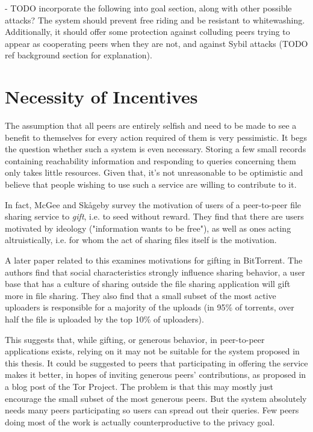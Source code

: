 - TODO incorporate the following into goal section, along with other possible
  attacks?
The system should prevent free riding and be resistant to whitewashing.
Additionally, it should offer some protection against colluding peers trying to
appear as cooperating peers when they are not, and against Sybil attacks (TODO
ref background section for explanation).

\section{Necessity of Incentives}
The assumption that all peers are entirely selfish and need to be made to see a
benefit to themselves for every action required of them is very pessimistic. It
begs the question whether such a system is even necessary. Storing a few small
records containing reachability information and responding to queries concerning
them only takes little resources. Given that, it's not unreasonable to be
optimistic and believe that people wishing to use such a service are willing to
contribute to it.

In fact, McGee and Sk{\aa}geby\cite{mcgee2004gifting} survey the motivation of
users of a peer-to-peer file sharing service to \emph{gift}, i.e. to seed
without reward. They find that there are users motivated by ideology
("information wants to be free"), as well as ones acting altruistically, i.e.
for whom the act of sharing files itself is the motivation.

A later paper\cite{ripeanu2006gifting} related to this examines motivations for
gifting in BitTorrent. The authors find that social characteristics strongly
influence sharing behavior, a user base that has a culture of sharing outside
the file sharing application will gift more in file sharing. They also find that
a small subset of the most active uploaders is responsible for a majority of the
uploads (in 95\% of torrents, over half the file is uploaded by the top 10\% of
uploaders).

This suggests that, while gifting, or generous behavior, in peer-to-peer
applications exists, relying on it may not be suitable for the system proposed
in this thesis. It could be suggested to peers that participating in offering
the service makes it better, in hopes of inviting generous peers' contributions,
as proposed in a blog post of the Tor Project\cite{dingledine2009incentive_tor}.
The problem is that this may mostly just encourage the small subset of the most
generous peers. But the system absolutely needs many peers participating so
users can spread out their queries. Few peers doing most of the work is actually
counterproductive to the privacy goal.


